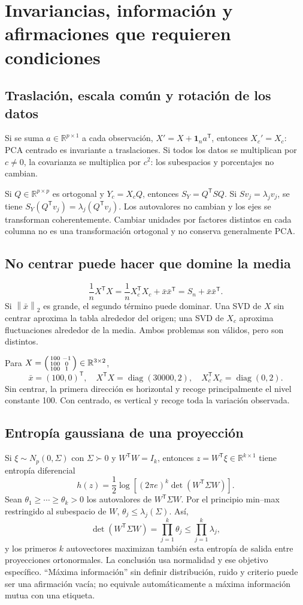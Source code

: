\documentclass[11pt,a4paper]{article}
\newcommand{\R}{\mathbb R}
\newcommand{\T}{^{\mathsf T}}
\newcommand{\norm}[1]{\left\lVert #1\right\rVert}
\DeclareMathOperator{\diag}{diag}
\newcommand{\ones}{\mathbf 1}
\theoremstyle{definition}
\begin{document}
\section{Invariancias, información y afirmaciones que requieren condiciones}
\subsection{Traslación, escala común y rotación de los datos}
Si se suma $a\in\R^{p\times1}$ a cada observación, $X'=X+\ones_na\T$, entonces $X_c'=X_c$: PCA centrado es invariante a traslaciones. Si todos los datos se multiplican por $c\ne0$, la covarianza se multiplica por $c^2$: los subespacios y porcentajes no cambian.

Si $Q\in\R^{p\times p}$ es ortogonal y $Y_c=X_cQ$, entonces $S_Y=Q\T SQ$. Si $Sv_j=\lambda_jv_j$, se tiene $S_Y(Q\T v_j)=\lambda_j(Q\T v_j)$. Los autovalores no cambian y los ejes se transforman coherentemente. Cambiar unidades por factores distintos en cada columna no es una transformación ortogonal y no conserva generalmente PCA.
\subsection{No centrar puede hacer que domine la media}
\[
\frac1nX\T X=\frac1nX_c\T X_c+\bar x\bar x\T=S_n+\bar x\bar x\T.
\]
Si $\norm{\bar x}_2$ es grande, el segundo término puede dominar. Una SVD de $X$ sin centrar aproxima la tabla alrededor del origen; una SVD de $X_c$ aproxima fluctuaciones alrededor de la media. Ambos problemas son válidos, pero son distintos.
\begin{ejemplo}
Para $X=\begin{psmallmatrix}100&-1\\100&0\\100&1\end{psmallmatrix}\in\R^{3\times2}$,
\[
\bar x=(100,0)\T,\quad X\T X=\diag(30000,2),\quad X_c\T X_c=\diag(0,2).
\]
Sin centrar, la primera dirección es horizontal y recoge principalmente el nivel constante 100. Con centrado, es vertical y recoge toda la variación observada.
\end{ejemplo}
\subsection{Entropía gaussiana de una proyección}
Si $\xi\sim N_p(0,\Sigma)$ con $\Sigma\succ0$ y $W\T W=I_k$, entonces $z=W\T\xi\in\R^{k\times1}$ tiene entropía diferencial
\[
h(z)=\frac12\log\left[(2\pi e)^k\det(W\T\Sigma W)\right].
\]
Sean $\theta_1\ge\cdots\ge\theta_k>0$ los autovalores de $W\T\Sigma W$. Por el principio min--max restringido al subespacio de $W$, $\theta_j\le\lambda_j(\Sigma)$. Así,
\[
\det(W\T\Sigma W)=\prod_{j=1}^k\theta_j\le\prod_{j=1}^k\lambda_j,
\]
y los primeros $k$ autovectores maximizan también esta entropía de salida entre proyecciones ortonormales. La conclusión usa normalidad y ese objetivo específico. ``Máxima información'' sin definir distribución, ruido y criterio puede ser una afirmación vacía; no equivale automáticamente a máxima información mutua con una etiqueta.
\end{document}
